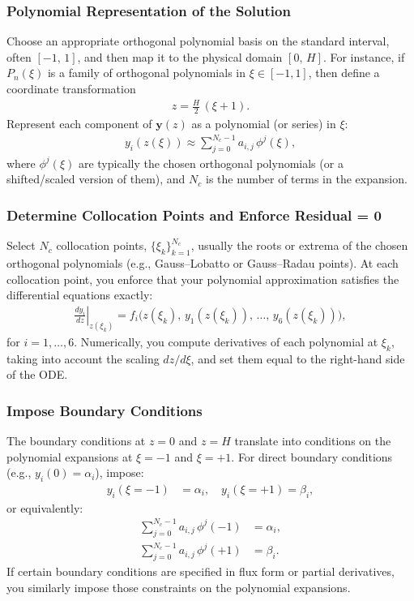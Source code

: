 \documentclass[a4paper,fleqn]{cas-sc}
\begin{document}
    \subsubsection*{Polynomial Representation of the Solution}
    Choose an appropriate orthogonal polynomial basis on the standard interval, often $[-1,\,1]$, and then map it to the physical domain $[0,\,H]$. For instance, if $P_n(\xi)$ is a family of orthogonal polynomials in $\xi \in [-1,1]$, then define a coordinate transformation
    \begin{align}
        z = \frac{H}{2}\,(\xi + 1).
    \end{align}
    Represent each component of $\mathbf{y}(z)$ as a polynomial (or series) in $\xi$:
    \begin{align}
        y_i(z(\xi)) \approx \sum_{j=0}^{N_c-1} a_{i,j}\,\phi^j(\xi),
    \end{align}
    where $\phi^j(\xi)$ are typically the chosen orthogonal polynomials (or a shifted/scaled version of them), and $N_c$ is the number of terms in the expansion.

    \subsubsection*{Determine Collocation Points and Enforce Residual = 0}
    Select $N_c$ collocation points, $\{\xi_k\}_{k=1}^{N_c}$, usually the roots or extrema of the chosen orthogonal polynomials (e.g., Gauss--Lobatto or Gauss--Radau points). At each collocation point, you enforce that your polynomial approximation satisfies the differential equations exactly:
    \begin{align}
        \left.\frac{d y_i}{dz}\right|_{z(\xi_k)} = f_i\bigl(z(\xi_k),\, y_1(z(\xi_k)),\, \ldots,\, y_6(z(\xi_k))\bigr),
    \end{align}
    for $i=1,\ldots,6$. Numerically, you compute derivatives of each polynomial at $\xi_k$, taking into account the scaling $dz/d\xi$, and set them equal to the right-hand side of the ODE.

    \subsubsection*{Impose Boundary Conditions}
    The boundary conditions at $z=0$ and $z=H$ translate into conditions on the polynomial expansions at $\xi=-1$ and $\xi=+1$. For direct boundary conditions (e.g., $y_i(0) = \alpha_i$), impose:
    \begin{align}
        y_i(\xi=-1) &= \alpha_i, \quad
        y_i(\xi=+1) = \beta_i,
    \end{align}
    or equivalently:
    \begin{align}
        \sum_{j=0}^{N_c-1} a_{i,j}\,\phi^j(-1) &= \alpha_i, \\
        \sum_{j=0}^{N_c-1} a_{i,j}\,\phi^j(+1) &= \beta_i.
    \end{align}
    If certain boundary conditions are specified in flux form or partial derivatives, you similarly impose those constraints on the polynomial expansions.
\end{document}
